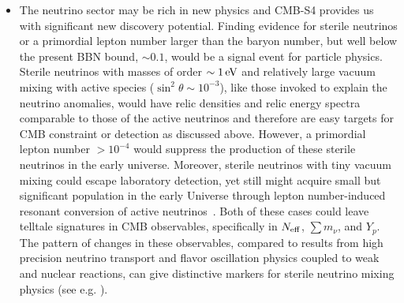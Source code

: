 \begin{itemize}
\item The neutrino sector may be rich in new physics and CMB-S4 provides us with significant new discovery potential. Finding evidence for sterile neutrinos or a primordial lepton number larger than the baryon number, but well below the present BBN bound, $\sim 0.1$, would be a signal event for particle physics. Sterile neutrinos with masses of order $\sim 1\,{\rm eV}$ and relatively large vacuum mixing with active species ($\sin^2 \theta \sim 10^{-3}$), like those invoked to explain the neutrino anomalies, would have relic densities and relic energy spectra comparable to those of the active neutrinos and therefore are easy targets for CMB constraint or detection as discussed above. However, a primordial lepton number $> {10}^{-4}$ would suppress the production of these sterile neutrinos in the early universe. Moreover, sterile neutrinos with tiny vacuum mixing could escape laboratory detection, yet still might acquire small but significant population in the early Universe through lepton number-induced resonant conversion of active neutrinos~\cite{Abazajian:2005gj}. Both of these cases could leave telltale signatures in CMB observables, specifically in $N_{\rm eff}$, $\sum m_\nu$, and $Y_p$. The pattern of changes in these observables, compared to results from high precision neutrino transport and flavor oscillation physics coupled to weak and nuclear reactions, can give distinctive markers for sterile neutrino mixing physics (see e.g. \cite{Smith:2006uw, Grohs:2015tfy}).

\end{itemize}
